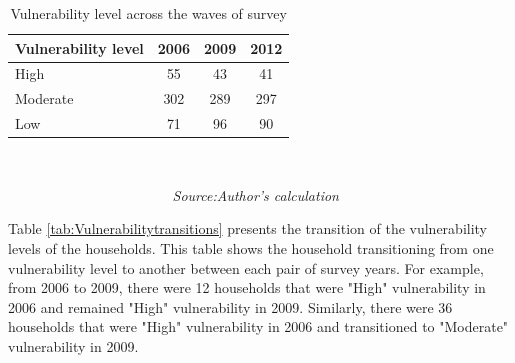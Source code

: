 \begin{table}[htb]
	\caption{Vulnerability level across the waves of survey} 
\begin{center}
		\begin{tabular}{lccc} \hline
			\textbf{Vulnerability level} & \textbf{2006}            & \textbf{2009}            & \textbf{2012}           \\ \hline
			High                         & 55                       & 43                       & 41                      \\
			Moderate                     & 302                      & 289                      & 297                     \\
			Low                          & 71                       & 96                       & 90                \\ \hline \hline     
		\end{tabular}\\
	\end{center}\vspace{-8pt}
	\textit{\ \ \ \ \ \ \ \ \ \ \ \ \ \ \  \ \ \ \ \ \ \ \ Source:Author's calculation}
	\label{tab:Vulnerabilitylevels} 	
\end{table}

Table \ref{tab:Vulnerabilitytransitions} presents the transition of the vulnerability levels of the households. This table shows the household transitioning from one vulnerability level to another between each pair of survey years. For example, from 2006 to 2009, there were 12 households that were "High" vulnerability in 2006 and remained "High" vulnerability in 2009. Similarly, there were 36 households that were "High" vulnerability in 2006 and transitioned to "Moderate" vulnerability in 2009.

